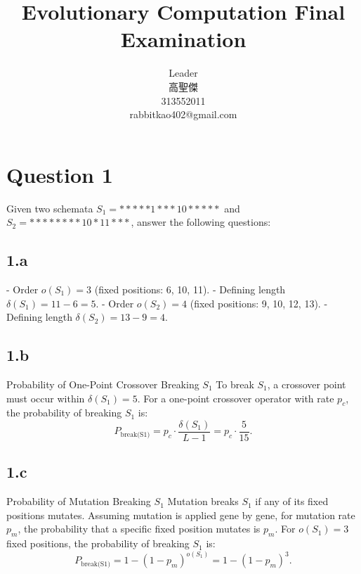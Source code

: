 \documentclass[12pt,letterpaper]{article}
\begin{document}
\begin{CJK}{UTF8}{bkai}
    \title{Evolutionary Computation Final Examination}
    
    \author{
        Leader\\
        高聖傑\\
        313552011\\
        rabbitkao402@gmail.com
    }

    \maketitle
\end{CJK}

\section*{Question 1}
Given two schemata \( S_1 = *****1***10***** \) and \( S_2 = ********10*11*** \), answer the following questions:
\subsection*{1.a}
- Order \( o(S_1) = 3 \) (fixed positions: 6, 10, 11).
- Defining length \( \delta(S_1) = 11 - 6 = 5 \).
- Order \( o(S_2) = 4 \) (fixed positions: 9, 10, 12, 13).
- Defining length \( \delta(S_2) = 13 - 9 = 4 \).

\subsection*{1.b}
Probability of One-Point Crossover Breaking \( S_1 \)
To break \( S_1 \), a crossover point must occur within \( \delta(S_1) = 5 \).
For a one-point crossover operator with rate \( p_c \), the probability of breaking \( S_1 \) is:
\[
P_{\text{break(S1)}} = p_c \cdot \frac{\delta(S_1)}{L - 1} = p_c \cdot \frac{5}{15}.
\]

\subsection*{1.c}
Probability of Mutation Breaking \( S_1 \)
Mutation breaks \( S_1 \) if any of its fixed positions mutates.
Assuming mutation is applied gene by gene, for mutation rate \( p_m \), the probability that a specific fixed position mutates is \( p_m \).
For \( o(S_1) = 3 \) fixed positions, the probability of breaking \( S_1 \) is:
  \[
  P_{\text{break(S1)}} = 1 - (1 - p_m)^{o(S_1)} = 1 - (1 - p_m)^3.
  \]
\end{document}
